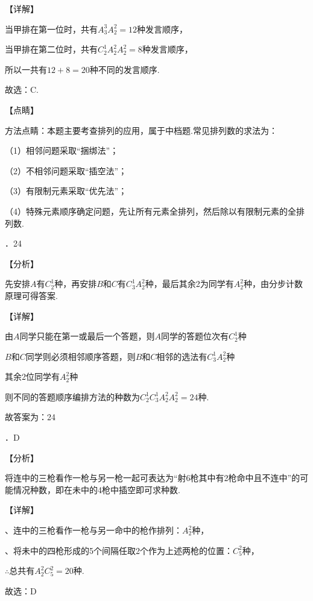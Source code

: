\documentclass[a4paper,11pt,UTF8,twoside]{ctexart} %
\begin{document}
\noindent 【详解】

\noindent 当甲排在第一位时，共有$A_{3}^{3} A_{2}^{2} =12$种发言顺序，

\noindent 当甲排在第二位时，共有$C_{2}^{1} A_{2}^{2} A_{2}^{2} =8$种发言顺序，

\noindent 所以一共有$12+8=20$种不同的发言顺序.

\noindent 故选：C.

\noindent 【点睛】

\noindent 方法点睛：本题主要考查排列的应用，属于中档题.常见排列数的求法为：

\noindent （1）相邻问题采取``捆绑法''；

\noindent （2）不相邻问题采取``插空法''；

\noindent （3）有限制元素采取``优先法''；

\noindent （4）特殊元素顺序确定问题，先让所有元素全排列，然后除以有限制元素的全排列数.

．24

\noindent 【分析】

\noindent 先安排$A$有$C_{2}^{1} $种，再安排$B$和$C$有$C_{3}^{1} A_{2}^{2} $种，最后其余2为同学有$A_{2}^{2} $种，由分步计数原理可得答案.

\noindent 【详解】

\noindent 由$A$同学只能在第一或最后一个答题，则$A$同学的答题位次有$C_{2}^{1} $种

\noindent $B$和$C$同学则必须相邻顺序答题，则$B$和$C$相邻的选法有$C_{3}^{1} A_{2}^{2} $种

\noindent 其余2位同学有$A_{2}^{2} $种

\noindent 则不同的答题顺序编排方法的种数为$C_{2}^{1} $$C_{3}^{1} A_{2}^{2} $$A_{2}^{2} =24$种.

\noindent 故答案为：24

．D

\noindent 【分析】

\noindent 将连中的三枪看作一枪与另一枪一起可表达为``射6枪其中有2枪命中且不连中''的可能情况种数，即在未中的4枪中插空即可求种数.

\noindent 【详解】

、连中的三枪看作一枪与另一命中的枪作排列：$A_{2}^{2} $种，

、将未中的四枪形成的5个间隔任取2个作为上述两枪的位置：$C_{5}^{2} $种，

\noindent $\mathrm{\therefore}$总共有$A_{2}^{2} C_{5}^{2} =20$种.

\noindent 故选：D
\end{document}
